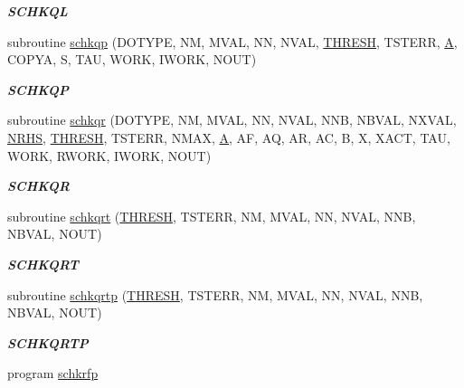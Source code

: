 \begin{DoxyCompactItemize}
\begin{DoxyCompactList}\small\item\em {\bfseries S\+C\+H\+K\+Q\+L} \end{DoxyCompactList}\item 
subroutine \hyperlink{group__single__lin_gaa424bf4cc7c90a27aa42e7edfd67a8c1}{schkqp} (D\+O\+T\+Y\+P\+E, N\+M, M\+V\+A\+L, N\+N, N\+V\+A\+L, \hyperlink{zlaqgs_8c_a0656018abfc9fa2821827415f5d5ea57}{T\+H\+R\+E\+S\+H}, T\+S\+T\+E\+R\+R, \hyperlink{classA}{A}, C\+O\+P\+Y\+A, S, T\+A\+U, W\+O\+R\+K, I\+W\+O\+R\+K, N\+O\+U\+T)
\begin{DoxyCompactList}\small\item\em {\bfseries S\+C\+H\+K\+Q\+P} \end{DoxyCompactList}\item 
subroutine \hyperlink{group__single__lin_gaeb9f8007c82f5e55914ebcc5f8b65280}{schkqr} (D\+O\+T\+Y\+P\+E, N\+M, M\+V\+A\+L, N\+N, N\+V\+A\+L, N\+N\+B, N\+B\+V\+A\+L, N\+X\+V\+A\+L, \hyperlink{example__user_8c_aa0138da002ce2a90360df2f521eb3198}{N\+R\+H\+S}, \hyperlink{zlaqgs_8c_a0656018abfc9fa2821827415f5d5ea57}{T\+H\+R\+E\+S\+H}, T\+S\+T\+E\+R\+R, N\+M\+A\+X, \hyperlink{classA}{A}, A\+F, A\+Q, A\+R, A\+C, B, X, X\+A\+C\+T, T\+A\+U, W\+O\+R\+K, R\+W\+O\+R\+K, I\+W\+O\+R\+K, N\+O\+U\+T)
\begin{DoxyCompactList}\small\item\em {\bfseries S\+C\+H\+K\+Q\+R} \end{DoxyCompactList}\item 
subroutine \hyperlink{group__single__lin_ga223cf16ef765b85b586ae27f510729e1}{schkqrt} (\hyperlink{zlaqgs_8c_a0656018abfc9fa2821827415f5d5ea57}{T\+H\+R\+E\+S\+H}, T\+S\+T\+E\+R\+R, N\+M, M\+V\+A\+L, N\+N, N\+V\+A\+L, N\+N\+B, N\+B\+V\+A\+L, N\+O\+U\+T)
\begin{DoxyCompactList}\small\item\em {\bfseries S\+C\+H\+K\+Q\+R\+T} \end{DoxyCompactList}\item 
subroutine \hyperlink{group__single__lin_ga410f02603228a2ed50b7a919b3d74799}{schkqrtp} (\hyperlink{zlaqgs_8c_a0656018abfc9fa2821827415f5d5ea57}{T\+H\+R\+E\+S\+H}, T\+S\+T\+E\+R\+R, N\+M, M\+V\+A\+L, N\+N, N\+V\+A\+L, N\+N\+B, N\+B\+V\+A\+L, N\+O\+U\+T)
\begin{DoxyCompactList}\small\item\em {\bfseries S\+C\+H\+K\+Q\+R\+T\+P} \end{DoxyCompactList}\item 
program \hyperlink{group__single__lin_gade3cced2f04dda3067af656de6b93f76}{schkrfp}

\end{DoxyCompactItemize}
